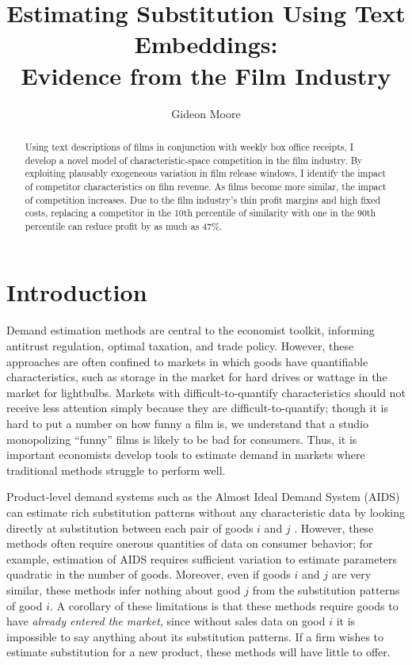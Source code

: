 \documentclass{article}
\author{Gideon Moore}
\title{Estimating Substitution Using Text Embeddings: \\ Evidence from the Film Industry}
\begin{document}
\maketitle 

\begin{abstract}
    Using text descriptions of films in conjunction with weekly box office receipts, I develop a novel model of characteristic-space competition in the film industry. By exploiting plausably exogeneous variation in film release windows, I identify the impact of competitor characteristics on film revenue. As films become more similar, the impact of competition increases. Due to the film industry's thin profit margins and high fixed costs, replacing a competitor in the 10th percentile of similarity with one in the 90th percentile can reduce profit by as much as 47\%. 
\end{abstract}

\section{Introduction}

Demand estimation methods are central to the economist toolkit, informing antitrust regulation, optimal taxation, and trade policy. However, these approaches are often confined to markets in which goods have quantifiable characteristics, such as storage in the market for hard drives or wattage in the market for lightbulbs. Markets with difficult-to-quantify characteristics should not receive less attention simply because they are difficult-to-quantify; though it is hard to put a number on how funny a film is, we understand that a studio monopolizing ``funny'' films is likely to be bad for consumers. Thus, it is important economists develop tools to estimate demand in markets where traditional methods struggle to perform well.

Product-level demand systems such as the Almost Ideal Demand System (AIDS) can estimate rich substitution patterns without any characteristic data by looking directly at substitution between each pair of goods $i$ and $j$ \parencite{deaton1980AER}. However, these methods often require onerous quantities of data on consumer behavior; for example, estimation of AIDS requires sufficient variation to estimate parameters quadratic in the number of goods. Moreover, even if goods $i$ and $j$ are very similar, these methods infer nothing about good $j$ from the substitution patterns of good $i$. A corollary of these limitations is that these methods require goods to have \emph{already entered the market}, since without sales data on good $i$ it is impossible to say anything about its substitution patterns. If a firm wishes to estimate substitution for a new product, these methods will have little to offer.
\end{document}
